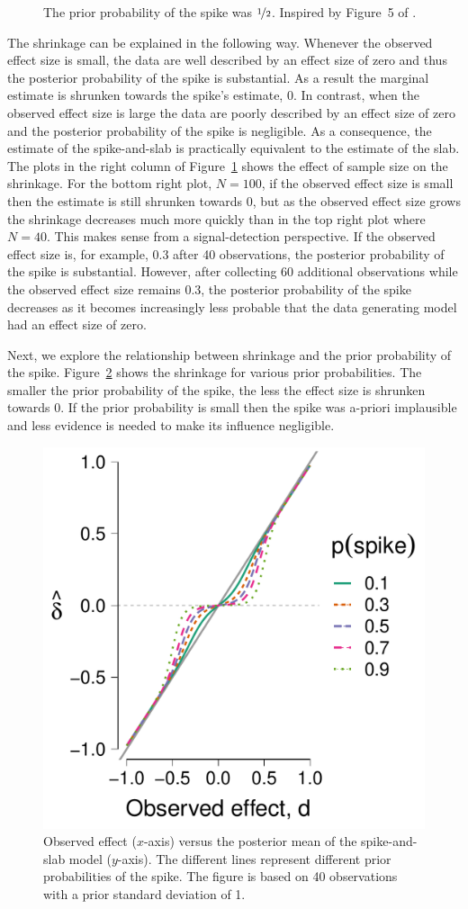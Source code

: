 \documentclass[a4paper]{article}
\newenvironment{revision}{\color{teal}}{\color{black}}
\begin{document}
\begin{revision}
\begin{figure}[!ht]
{		The prior probability of the spike was $\nicefrac{1}{2}$.
		Inspired by Figure~5 of \textcite{RouderEtAl2018PBR}.
	}
	\label{fig:S_vs_SS_4_panel}
\end{figure}
The shrinkage can be explained in the following way.
Whenever the observed effect size is small, the data are well described by an effect size of zero and thus the posterior probability of the spike is substantial.
As a result the marginal estimate is shrunken towards the spike's estimate, 0.
In contrast, when the observed effect size is large the data are poorly described by an effect size of zero and the posterior probability of the spike is negligible.
As a consequence, the estimate of the spike-and-slab is practically equivalent to the estimate of the slab.
The plots in the right column of Figure~\ref{fig:S_vs_SS_4_panel} shows the effect of sample size on the shrinkage.
For the bottom right plot, $N = 100$, if the observed effect size is small then the estimate is still shrunken towards 0, but as the observed effect size grows the shrinkage decreases much more quickly than in the top right plot where $N = 40$.
This makes sense from a signal-detection perspective. 
If the observed effect size is, for example, 0.3 after 40 observations, the posterior probability of the spike is substantial.
However, after collecting 60 additional observations while the observed effect size remains 0.3, the posterior probability of the spike decreases as it becomes increasingly less probable that the data generating model had an effect size of zero.


Next, we explore the relationship between shrinkage and the prior probability of the spike.
Figure~\ref{fig:S_vs_SS_PH0_40} shows the shrinkage for various prior probabilities.
The smaller the prior probability of the spike, the less the effect size is shrunken towards 0.
If the prior probability is small then the spike was a-priori implausible and less evidence is needed to make its influence negligible.
\begin{figure}[!ht]
	\centering
	\includegraphics[width=.5\textwidth]{posteriorMeanVsSampleDelta_ph0_n_40_big_font.pdf}
	\caption{%
		Observed effect ($x$-axis) versus the posterior mean of the spike-and-slab model ($y$-axis). The different lines represent different prior probabilities of the spike. The figure is based on 40 observations with a prior standard deviation of 1.
	}
	\label{fig:S_vs_SS_PH0_40}
\end{figure}


\end{revision}
\end{document}

